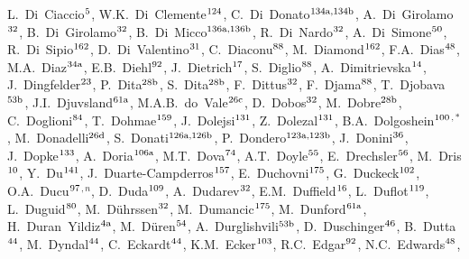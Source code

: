 \begin{flushleft}
L.~Di~Ciaccio$^\textrm{\scriptsize 5}$,
W.K.~Di~Clemente$^\textrm{\scriptsize 124}$,
C.~Di~Donato$^\textrm{\scriptsize 134a,134b}$,
A.~Di~Girolamo$^\textrm{\scriptsize 32}$,
B.~Di~Girolamo$^\textrm{\scriptsize 32}$,
B.~Di~Micco$^\textrm{\scriptsize 136a,136b}$,
R.~Di~Nardo$^\textrm{\scriptsize 32}$,
A.~Di~Simone$^\textrm{\scriptsize 50}$,
R.~Di~Sipio$^\textrm{\scriptsize 162}$,
D.~Di~Valentino$^\textrm{\scriptsize 31}$,
C.~Diaconu$^\textrm{\scriptsize 88}$,
M.~Diamond$^\textrm{\scriptsize 162}$,
F.A.~Dias$^\textrm{\scriptsize 48}$,
M.A.~Diaz$^\textrm{\scriptsize 34a}$,
E.B.~Diehl$^\textrm{\scriptsize 92}$,
J.~Dietrich$^\textrm{\scriptsize 17}$,
S.~Diglio$^\textrm{\scriptsize 88}$,
A.~Dimitrievska$^\textrm{\scriptsize 14}$,
J.~Dingfelder$^\textrm{\scriptsize 23}$,
P.~Dita$^\textrm{\scriptsize 28b}$,
S.~Dita$^\textrm{\scriptsize 28b}$,
F.~Dittus$^\textrm{\scriptsize 32}$,
F.~Djama$^\textrm{\scriptsize 88}$,
T.~Djobava$^\textrm{\scriptsize 53b}$,
J.I.~Djuvsland$^\textrm{\scriptsize 61a}$,
M.A.B.~do~Vale$^\textrm{\scriptsize 26c}$,
D.~Dobos$^\textrm{\scriptsize 32}$,
M.~Dobre$^\textrm{\scriptsize 28b}$,
C.~Doglioni$^\textrm{\scriptsize 84}$,
T.~Dohmae$^\textrm{\scriptsize 159}$,
J.~Dolejsi$^\textrm{\scriptsize 131}$,
Z.~Dolezal$^\textrm{\scriptsize 131}$,
B.A.~Dolgoshein$^\textrm{\scriptsize 100}$$^{,*}$,
M.~Donadelli$^\textrm{\scriptsize 26d}$,
S.~Donati$^\textrm{\scriptsize 126a,126b}$,
P.~Dondero$^\textrm{\scriptsize 123a,123b}$,
J.~Donini$^\textrm{\scriptsize 36}$,
J.~Dopke$^\textrm{\scriptsize 133}$,
A.~Doria$^\textrm{\scriptsize 106a}$,
M.T.~Dova$^\textrm{\scriptsize 74}$,
A.T.~Doyle$^\textrm{\scriptsize 55}$,
E.~Drechsler$^\textrm{\scriptsize 56}$,
M.~Dris$^\textrm{\scriptsize 10}$,
Y.~Du$^\textrm{\scriptsize 141}$,
J.~Duarte-Campderros$^\textrm{\scriptsize 157}$,
E.~Duchovni$^\textrm{\scriptsize 175}$,
G.~Duckeck$^\textrm{\scriptsize 102}$,
O.A.~Ducu$^\textrm{\scriptsize 97}$$^{,n}$,
D.~Duda$^\textrm{\scriptsize 109}$,
A.~Dudarev$^\textrm{\scriptsize 32}$,
E.M.~Duffield$^\textrm{\scriptsize 16}$,
L.~Duflot$^\textrm{\scriptsize 119}$,
L.~Duguid$^\textrm{\scriptsize 80}$,
M.~D\"uhrssen$^\textrm{\scriptsize 32}$,
M.~Dumancic$^\textrm{\scriptsize 175}$,
M.~Dunford$^\textrm{\scriptsize 61a}$,
H.~Duran~Yildiz$^\textrm{\scriptsize 4a}$,
M.~D\"uren$^\textrm{\scriptsize 54}$,
A.~Durglishvili$^\textrm{\scriptsize 53b}$,
D.~Duschinger$^\textrm{\scriptsize 46}$,
B.~Dutta$^\textrm{\scriptsize 44}$,
M.~Dyndal$^\textrm{\scriptsize 44}$,
C.~Eckardt$^\textrm{\scriptsize 44}$,
K.M.~Ecker$^\textrm{\scriptsize 103}$,
R.C.~Edgar$^\textrm{\scriptsize 92}$,
N.C.~Edwards$^\textrm{\scriptsize 48}$,

\end{flushleft}
